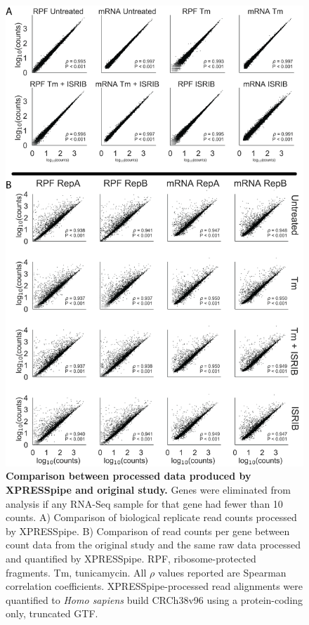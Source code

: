 \documentclass[10pt, oneside]{article}
\begin{document}
\begin{figure}
\centering
  \includegraphics[width=160mm]{figures/xpresspipe_supplement3.png}
  \caption{\textbf{Comparison between processed data produced by XPRESSpipe and original study.} Genes were eliminated from analysis if any RNA-Seq sample for that gene had fewer than 10 counts. A) Comparison of biological replicate read counts processed by XPRESSpipe. B) Comparison of read counts per gene between count data from the original study and the same raw data processed and quantified by XPRESSpipe. RPF, ribosome-protected fragments. Tm, tunicamycin. All $\rho$ values reported are Spearman correlation coefficients. XPRESSpipe-processed read alignments were quantified to \textit{Homo sapiens} build CRCh38v96 using a protein-coding only, truncated GTF.}
  \label{fig:supplement3}
\end{figure}
\end{document}
